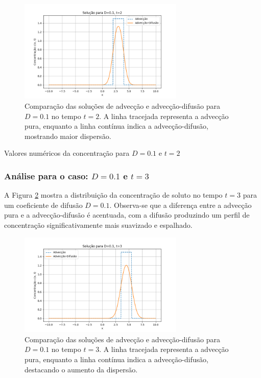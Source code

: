 \begin{figure}[H]
    \centering
    \includegraphics[width=0.7\textwidth]{code/plot/Advec_Difus_t2_D0.1.png}
    \caption{Comparação das soluções de advecção e advecção-difusão para \( D = 0.1 \) no tempo \( t = 2 \). A linha tracejada representa a advecção pura, enquanto a linha contínua indica a advecção-difusão, mostrando maior dispersão.}
    \label{fig:advec_diffus_0.1_t2}
\end{figure}

\begin{table}[H]
    \centering
    \caption{Valores numéricos da concentração para \( D = 0.1 \) e \( t = 2 \)}
    
\end{table}

\subsubsection{Análise para o caso: \( D = 0.1 \) e \( t = 3 \)}

A Figura \ref{fig:advec_diffus_0.1_t3} mostra a distribuição da concentração de soluto no tempo \( t = 3 \) para um coeficiente de difusão \( D = 0.1 \). Observa-se que a diferença entre a advecção pura e a advecção-difusão é acentuada, com a difusão produzindo um perfil de concentração significativamente mais suavizado e espalhado.

\begin{figure}[H]
    \centering
    \includegraphics[width=0.7\textwidth]{code/plot/Advec_Difus_t3_D0.1.png}
    \caption{Comparação das soluções de advecção e advecção-difusão para \( D = 0.1 \) no tempo \( t = 3 \). A linha tracejada representa a advecção pura, enquanto a linha contínua indica a advecção-difusão, destacando o aumento da dispersão.}
    \label{fig:advec_diffus_0.1_t3}
\end{figure}

